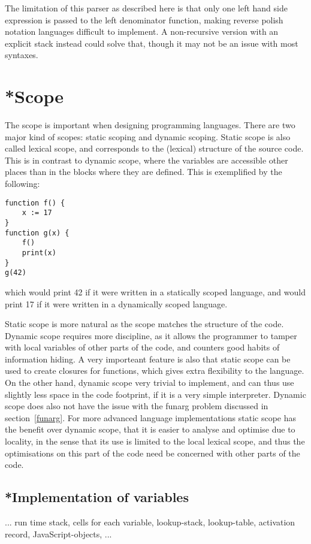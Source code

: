 The limitation of this parser as described here is that only one left hand side expression is passed to the left denominator function, making reverse polish notation languages difficult to implement. A non-recursive version with an explicit stack instead could solve that, though it may not be an issue with most syntaxes. 

\section{*Scope}
The scope is important when designing programming languages.
There are two major kind of scopes: static scoping and dynamic scoping.
Static scope is also called lexical scope, and corresponds to the (lexical) structure of the source code.
This is in contrast to dynamic scope, where the variables are accessible other places than in the blocks where they are defined. This is exemplified by the following:
\begin{verbatim}
function f() {
    x := 17
}
function g(x) {
    f()
    print(x)
}
g(42)
\end{verbatim}
which would print 42 if it were written in a statically scoped language, and would print 17 if it were written in a dynamically scoped language.

Static scope is more natural as the scope matches the structure of the code. Dynamic scope requires more discipline, as it allows the programmer to tamper with local variables of other parts of the code, and counters good habits of information hiding. A very importeant feature is also that static scope can be used to create closures for functions, which gives extra flexibility to the language.
On the other hand, dynamic scope very trivial to implement, and can thus use slightly less space in the code footprint, if it is a very simple interpreter. Dynamic scope does also not have the issue with the funarg problem discussed in section~\ref{funarg}.
For more advanced language implementations static scope has the benefit over dynamic scope, that it is easier to analyse and optimise due to locality, in the sense that its use is limited to the local lexical scope, and thus the optimisations on this part of the code need be concerned with other parts of the code.


\subsection{*Implementation of variables}
... run time stack, cells for each variable, lookup-stack, lookup-table, activation record, JavaScript-objects, ...


